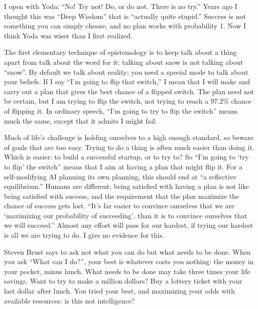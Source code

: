 
I open with Yoda: ``No! Try not! Do, or do not. There is no try.'' Years ago I thought this was ``Deep Wisdom'' that is ``actually quite stupid.'' Success is not something you can simply choose, and no plan works with probability 1. Now I think Yoda was wiser than I first realized.

The first elementary technique of epistemology is to keep talk about a thing apart from talk about the word for it: talking about snow is not talking about ``snow''. By default we talk about reality; you need a special mode to talk about your beliefs. If I say ``I'm going to flip that switch,'' I mean that I will make and carry out a plan that gives the best chance of a flipped switch. The plan need not be certain, but I am trying to flip the switch, not trying to reach a 97.2\% chance of flipping it. In ordinary speech, ``I'm going to try to flip the switch'' means much the same, except that it admits I might fail.

Much of life's challenge is holding ourselves to a high enough standard, so beware of goals that are too easy. Trying to do a thing is often much easier than doing it. Which is easier: to build a successful startup, or to try to? So ``I'm going to `try to flip' the switch'' means that I aim at having a plan that might flip it. For a self-modifying AI planning its own planning, this should end at ``a reflective equilibrium.'' Humans are different: being satisfied with having a plan is not like being satisfied with success, and the requirement that the plan maximize the chance of success gets lost. ``It's far easier to convince ourselves that we are `maximizing our probability of succeeding', than it is to convince ourselves that we will succeed.'' Almost any effort will pass for our hardest, if trying our hardest is all we are trying to do. I give no evidence for this. 

Steven Brust says to ask not what you can do but what needs to be done. When you ask ``What can I do?'', your best is whatever costs you nothing: the money in your pocket, minus lunch. What needs to be done may take three times your life savings. Want to try to make a million dollars? Buy a lottery ticket with your last dollar after lunch. You tried your best, and maximizing your odds with available resources: is this not intelligence?

